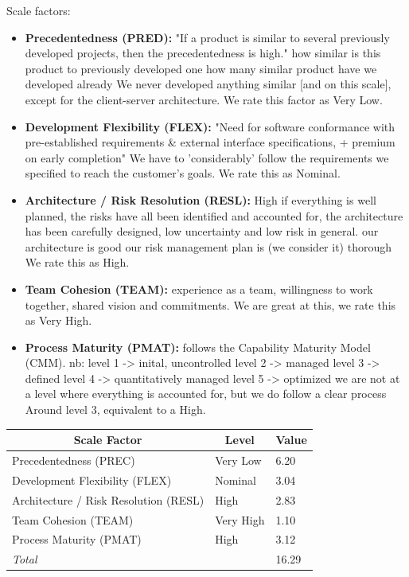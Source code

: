 \documentclass[english]{article}
\begin{document}
Scale factors:
\begin{itemize}
	\item \textbf{Precedentedness (PRED):} "If a product is similar to several previously developed projects, then the precedentedness is high."
	how similar is this product to previously developed one
	how many similar product have we developed already
	We never developed anything similar [and on this scale], except for the client-server architecture. We rate this factor as Very Low.
	\item \textbf{Development Flexibility (FLEX):} "Need for software conformance with pre-established requirements \& external interface specifications, + premium on early completion"
	We have to 'considerably' follow the requirements we specified to reach the customer's goals. We rate this as Nominal.
	\item \textbf{Architecture / Risk Resolution (RESL):} High if everything is well planned, the risks have all been identified and accounted for, the architecture has been carefully designed, low uncertainty and low risk in general.
	our architecture is good
	our risk management plan is (we consider it) thorough
	We rate this as High.
	\item \textbf{Team Cohesion (TEAM):} experience as a team, willingness to work together, shared vision and commitments.
	We are great at this, we rate this as Very High.
	\item \textbf{Process Maturity (PMAT):} follows the Capability Maturity Model (CMM).
	nb:
	level 1 -> inital, uncontrolled
	level 2 -> managed
	level 3 -> defined
	level 4 -> quantitatively managed
	level 5 -> optimized
	we are not at a level where everything is accounted for, but we do follow a clear process
	Around level 3, equivalent to a High.
\end{itemize}

\begin{center}
	\begin{tabular}{|p{6cm}|p{2cm}|p{1cm}|}
		\hline
		\multicolumn{1}{|c|}{\textbf{Scale Factor}} & \multicolumn{1}{c|}{\textbf{Level}} & \multicolumn{1}{c|}{\textbf{Value}} \\
		\hline
		Precedentedness (PREC) & Very Low & 6.20 \\
		Development Flexibility (FLEX) & Nominal & 3.04 \\
		Architecture / Risk Resolution (RESL) & High & 2.83 \\
		Team Cohesion (TEAM) & Very High & 1.10 \\
		Process Maturity (PMAT) & High & 3.12 \\
		\hline
		\multicolumn{2}{|l|}{\textit{Total}} & 16.29 \\
		\hline
	\end{tabular}
\end{center}
\end{document}

